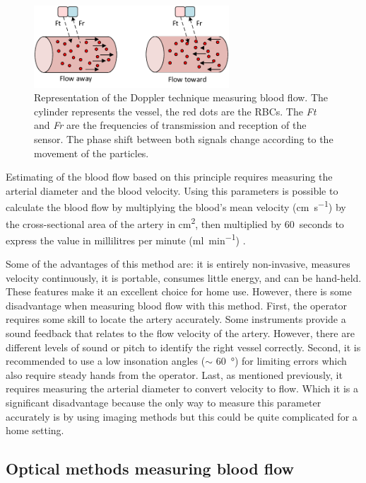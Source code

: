 \begin{figure}[!htpb]
	\centering
	\includegraphics[width=0.65\textwidth,keepaspectratio]{figure5}    
	\caption[Doppler technique to measure flow]{Representation of the Doppler technique measuring blood flow. The cylinder represents the vessel, the red dots are the RBCs. The \textit{Ft} and \textit{Fr} are the frequencies of transmission and reception of the sensor. The phase shift between both signals change according to the movement of the particles.}
	\label{fig:Doppler method}
\end{figure}

Estimating of the blood flow based on this principle requires measuring the arterial diameter and the blood velocity. Using this parameters is possible to calculate the blood flow by multiplying the blood's mean velocity (\si{\cm \per \second}) by the cross-sectional area of the artery in \si{\square \cm}, then multiplied by \SI{60}{seconds} to express the value in millilitres per minute (\si{\milli\litre\per\minute}) \cite{casey2008measuring}. 

Some of the advantages of this method are: it is entirely non-invasive, measures velocity continuously, it is portable, consumes little energy, and can be hand-held. These features make it an excellent choice for home use. However, there is some disadvantage when measuring blood flow with this method. First, the operator requires some skill to locate the artery accurately. Some instruments provide a sound feedback that relates to the flow velocity of the artery. However, there are different levels of sound or pitch to identify the right vessel correctly. Second, it is recommended to use a low insonation angles ($\sim$ \SI{60}{\degree}) for limiting errors \cite{raadegran1999limb} which also require steady hands from the operator. Last, as mentioned previously, it requires measuring the arterial diameter to convert velocity to flow. Which it is a significant disadvantage because the only way to measure this parameter accurately is by using imaging methods \cite{chapter4bloodflow} but this could be quite complicated for a home setting.

\subsection{Optical methods measuring blood flow}
\label{section literature Optic}


